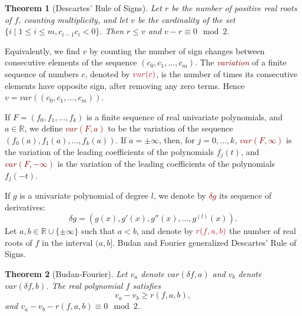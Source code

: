 \documentclass[12pt]{amsart}
\newtheorem{theorem}{Theorem}
\newtheorem{corollary}[theorem]{Corollary}
\theoremstyle{definition}
\newcommand{\RR}{\mathbb{R}}
\begin{document}
\begin{theorem}[Descartes' Rule of Signs]Let $r$ be the number of positive real roots of $f$, counting multiplicity, and let $v$ be the cardinality of the set $\{i\mid1\leq i\leq m, c_{i-1}c_{i}<0\}$. Then $r\leq v$ and $v-r\equiv 0 \mod 2$. \end{theorem}




Equivalently, we find $v$ by counting the number of sign changes between consecutive elements of the sequence $(c_{0},c_{1},\dots,c_{m})$. The \textit{\textcolor{Maroon}{variation}} of a finite sequence of numbers $c$, denoted by $\textcolor{Maroon}{var(c)}$, is the number of times its consecutive elements have opposite sign, after removing any zero terms. Hence $v = var\left((c_{0},c_{1},\dots,c_{m})\right)$.

If $F=(f_{0},f_{1},\dots,f_{k})$ is a finite sequence of real univariate polynomials, and $a\in \RR$, we define \textcolor{Maroon}{$var(F,a)$} to be the variation of the sequence $(f_{0}(a),f_{1}(a),\dots,f_{k}(a))$. If $a=\pm\infty$, then, for $j=0,\dots, k$, \textcolor{Maroon}{$var(F,\infty)$} is the variation of the leading coefficients of the polynomials $f_{j}(t)$, and \textcolor{Maroon}{$var(F,-\infty)$} is the variation of the leading coefficients of the polynomials $f_{j}(-t)$.

If $g$ is a univariate polynomial of degree $l$, we denote by \textcolor{Maroon}{$\delta g$} its sequence of derivatives: $$\delta g = \left(g(x),g'(x),g''(x),\dots,g^{(l)}(x)\right).$$ Let $a,b\in \RR\cup\{\pm \infty\}$ such that $a<b$, and denote by $\textcolor{Maroon}{r(f,a,b)}$ the number of real roots of $f$ in the interval $(a,b]$. Budan and Fourier \cite{MR2830310} generalized Descartes' Rule of Signs.

\begin{theorem}[Budan-Fourier] Let $v_{a}$ denote $var(\delta f,a)$ and $v_{b}$ denote $var(\delta f,b)$. The real polynomial $f$ satisfies $$v_{a} - v_{b} \geq r(f,a,b),$$ and $v_{a} - v_{b} - r(f,a,b) \equiv 0 \mod 2$.\end{theorem}
\end{document}
